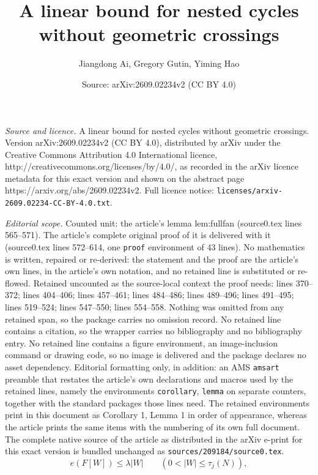 \documentclass[10pt,a4paper]{amsart}
\title{A linear bound for nested cycles without geometric crossings}
\author{Jiangdong Ai, Gregory Gutin, Yiming Hao}
\date{Source: arXiv:2609.02234v2 (CC BY 4.0)}
\begin{document}
\maketitle

\noindent\emph{Source and licence.} A linear bound for nested cycles without geometric crossings. Version arXiv:2609.02234v2 (CC BY 4.0), distributed by arXiv under the Creative Commons Attribution 4.0 International licence, http://creativecommons.org/licenses/by/4.0/, as recorded in the arXiv licence metadata for this exact version and shown on the abstract page https://arxiv.org/abs/2609.02234v2. Full licence notice: \texttt{licenses/arxiv-2609.02234-CC-BY-4.0.txt}.\par\smallskip

\noindent\textit{Editorial scope.} Counted unit: the article's lemma lem:fullfan (source0.tex lines 565--571). The article's complete original proof of it is delivered with it (source0.tex lines 572--614, one \texttt{proof} environment of 43 lines). No mathematics is written, repaired or re-derived: the statement and the proof are the article's own lines, in the article's own notation, and no retained line is substituted or re-flowed.  Retained uncounted as the source-local context the proof needs: lines 370--372; lines 404--406; lines 457--461; lines 484--486; lines 489--496; lines 491--495; lines 519--524; lines 547--550; lines 554--558.  Nothing was omitted from any retained span, so the package carries no omission record.  No retained line contains a citation, so the wrapper carries no bibliography and no bibliography entry.  No retained line contains a figure environment, an image-inclusion command or drawing code, so no image is delivered and the package declares no asset dependency.  Editorial formatting only, in addition: an AMS \texttt{amsart} preamble that restates the article's own declarations and macros used by the retained lines, namely the environments \texttt{corollary}, \texttt{lemma} on separate counters, together with the standard packages those lines need.  The retained environments print in this document as Corollary 1, Lemma 1 in order of appearance, whereas the article prints the same items with the numbering of its own full document.  The complete native source of the article as distributed in the arXiv e-print for this exact version is bundled unchanged as \texttt{sources/209184/source0.tex}.
\begin{equation}\label{eq:LS}
e(F[W])\le\lambda|W|\qquad(0<|W|\le\tau_j(N)),
\end{equation}
\end{document}

